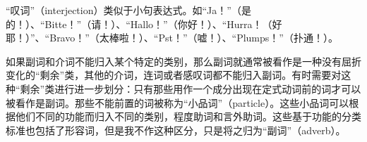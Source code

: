 “叹词”（interjection）类似于小句表达式。如“Ja！”（是的！）、“Bitte！”（请！）、“Hal\-lo！”（你好！）、“Hurra！（好耶！）”、“Bravo！”（太棒啦！）、“Pst！”（嘘！）、“Plumps！”（扑通！）。
 
如果副词和介词不能归入某个特定的类别，那么副词就通常被看作是一种没有屈折变化的“剩余”类，其他的介词，连词或者感叹词都不能归入副词。有时需要对这种“剩余”类进行进一步划分：只有那些用作一个成分出现在定式动词前的词才可以被看作是副词。那些不能前置的词被称为“小品词”（particle）。这些小品词可以根据他们不同的功能而归入不同的类别，\egc 程度助词和言外助词。这些基于功能的分类标准也包括了形容词，但是我不作这种区分，只是将之归为“副词”（adverb）。

